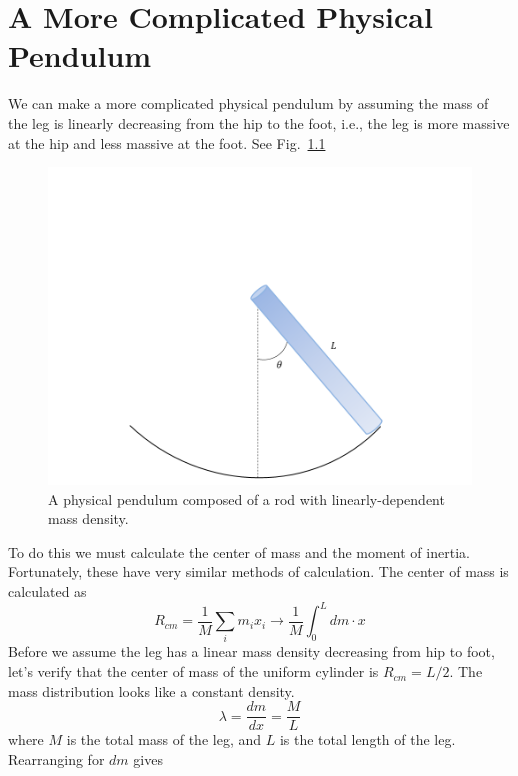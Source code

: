 \setcounter{chapter}{12}
\setcounter{section}{0}
\setcounter{figure}{0}
\setcounter{equation}{0}
\setcounter{table}{0}
\appendix 
{}

\chapter{A More Complicated Physical Pendulum}\label{appendix_walk}
We can make a more complicated physical pendulum by assuming the mass of the leg is linearly decreasing from the hip to the foot, i.e., the leg is more massive at the hip and less massive at the foot. See Fig.~\ref{FigA-1}
\begin{figure}[h]
	\centering
	\includegraphics[width=\textwidth]{./figures/Appendix/LinearPhysPend.png}
	\caption{A physical pendulum composed of a rod with linearly-dependent mass density.}
	\label{FigA-1}
\end{figure} 
To do this we must calculate the center of mass and the moment of inertia. Fortunately, these have very similar methods of calculation. The center of mass is calculated as
\begin{equation}\label{Rcmeqn}
    R_{cm} = \frac{1}{M}\sum_i m_i x_i \rightarrow \frac{1}{M}\int_0^L dm\cdot x
\end{equation}
Before we assume the leg has a linear mass density decreasing from hip to foot, let's verify that the center of mass of the uniform cylinder is $R_{cm}=L/2$. The mass distribution looks like a constant density.
$$\lambda = \frac{dm}{dx} = \frac{M}{L}$$
where $M$ is the total mass of the leg, and $L$ is the total length of the leg. Rearranging for $dm$ gives
